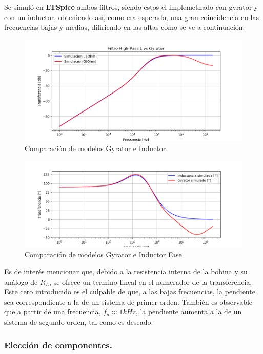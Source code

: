 Se simuló en \textbf{LTSpice} ambos filtros, siendo estos el implemetnado con gyrator y con un inductor, obteniendo así, como era esperado, una gran coincidencia en las frecuencias bajas y medias, difiriendo en las altas como se ve a continuación:
\begin{figure}[H]	
	\centering
	\includegraphics[width=\textwidth]{ImagenesEj2/simHP.PNG}
	\caption{Comparación de modelos Gyrator e Inductor.}
	\label{fig:gyrInd}
\end{figure}
\begin{figure}[H]	
	\centering
	\includegraphics[width=\textwidth]{ImagenesEj2/simHPP.PNG}
	\caption{Comparación de modelos Gyrator e Inductor Fase.}
	\label{fig:gyrIndP}
\end{figure}

Es de interés mencionar que, debido a la resistencia interna de la bobina y su análogo de $R_L$, se ofrece un termino lineal en el numerador de la transferencia. Este cero introducido es el culpable de que, a las bajas frecuencias, la pendiente sea correspondiente a la de un sistema de primer orden. También es observable que a partir de una frecuencia, $f_d \approx 1kHz $, la pendiente aumenta a la de un sistema de segundo orden, tal como es deseado.
\subsubsection{Elección de componentes.}

